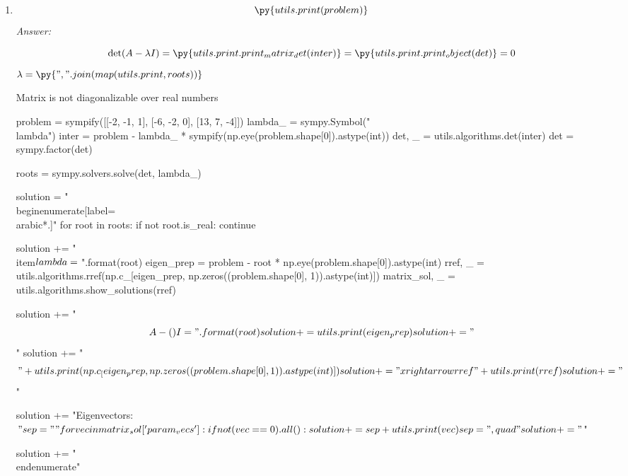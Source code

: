 \documentclass[letterpaper]{article}
\newcommand{\ans}{\textit{Answer: }}
\newenvironment{question}[2][Question]{\begin{trivlist}
\item[\hskip \labelsep {\bfseries #1}\hskip \labelsep {\bfseries #2.}]}{\end{trivlist}}
\newcommand{\printobj}[1]{\py{utils.print.print_object(#1)}}
\begin{document}
\begin{question}{5.5}
\begin{enumerate}[label=\textbf{(\alph*)}]

    \item $$\py{utils.print(problem)}$$
    \ans

    $$\det(A - \lambda I) = \py{utils.print.print_matrix_det(inter)} = \printobj{det} = 0$$
    $\lambda = $


    Matrix is not diagonalizable over real numbers
    \begin{pycode}
problem = sympify([[-2, -1, 1], [-6, -2, 0], [13, 7, -4]])
lambda_ = sympy.Symbol("\\lambda")
inter = problem - lambda_ * sympify(np.eye(problem.shape[0]).astype(int))
det, _ = utils.algorithms.det(inter)
det = sympy.factor(det)

roots = sympy.solvers.solve(det, lambda_)

solution = "\\begin{enumerate}[label=\\arabic*.]\n"
for root in roots:
  if not root.is_real:
      continue

  solution += "\\item$\\lambda = {}$\n".format(root)
  eigen_prep = problem - root * np.eye(problem.shape[0]).astype(int)
  rref, _ = utils.algorithms.rref(np.c_[eigen_prep, np.zeros((problem.shape[0], 1)).astype(int)])
  matrix_sol, _ = utils.algorithms.show_solutions(rref)

  solution += "$$A - ({}) I = ".format(root)
  solution += utils.print(eigen_prep)
  solution += "$$\n"
  solution += "$$" + utils.print(np.c_[eigen_prep, np.zeros((problem.shape[0], 1)).astype(int)])
  solution += "\\xrightarrow{rref}" + utils.print(rref)
  solution += "$$\n"

  solution += "Eigenvectors: $"

  sep = ""
  for vec in matrix_sol['param_vecs']:
    if not (vec == 0).all():
      solution += sep + utils.print(vec)
      sep = ",\\quad"

  solution += "$\n"

solution += "\\end{enumerate}"


\end{pycode}
\end{enumerate}
\end{question}
\end{document}
